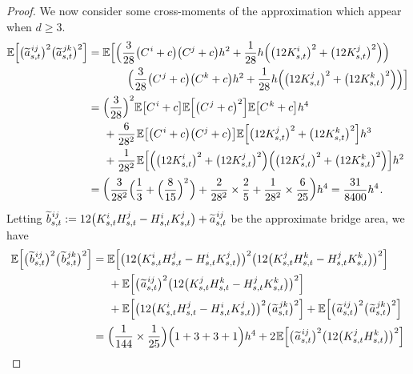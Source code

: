 \documentclass[sn-mathphys-num]{sn-jnl}%
\newcommand{\E}{\mathbb{E}}
\newcommand{\m}{\hspace{0.25mm}}
\newcommand{\mm}{\hspace{5mm}}
\begin{document}
\begin{proof}
We now consider some cross-moments of the approximation which appear when $d\geq 3$.
\begin{align*}
\E\Big[\big(\widetilde{a}_{s,t}^{\m ij}\big)^2\big(\widetilde{a}_{s,t}^{\m jk}\big)^2\Big]
& = \E\Big[\Big(\frac{3}{28}\big(C^{\m i} + c\big)\big(C^j + c\big)h^2 + \frac{1}{28}h\Big(\big(12 K_{s,t}^i\big)^2 + \big(12 K_{s,t}^j\big)^2\Big)\Big)\\
&\hspace{12.5mm}\Big(\frac{3}{28}\big(C^{\m j} + c\big)\big(C^k + c\big)h^2 + \frac{1}{28}h\Big(\big(12 K_{s,t}^j\big)^2 + \big(12 K_{s,t}^k\big)^2\Big)\Big)\Big]\\[1pt]
& = \Big(\frac{3}{28}\Big)^2 \E\big[C^{\m i} + c\big]\E\Big[\big(C^{\m j} + c\big)^2\Big]\E\big[C^{\m k} + c\big] h^4\\
&\mm + \frac{6}{28^2}\m\E\big[\big(C^{\m i} + c\big)\big(C^j + c\big)\big]\E\Big[\big(12 K_{s,t}^j\big)^2 + \big(12 K_{s,t}^k\big)^2\Big] h^3\\
&\mm + \frac{1}{28^2}\m\E\Big[\Big(\big(12 K_{s,t}^i\big)^2 + \big(12 K_{s,t}^j\big)^2\Big)\Big(\big(12 K_{s,t}^j\big)^2 + \big(12 K_{s,t}^k\big)^2\Big)\Big] h^2\\[1pt]
& = \bigg(\frac{3}{28^2}\Big(\frac{1}{3} + \Big(\frac{8}{15}\Big)^2\m\Big) + \frac{2}{28^2}\times \frac{2}{5} + \frac{1}{28^2}\times\frac{6}{25}\bigg)h^4 = \frac{31}{8400}h^4\m.
\end{align*}
Letting $\widetilde{b}_{s,t}^{\m ij} := 12\big(K_{s,t}^i H_{s,t}^j - H_{s,t}^i K_{s,t}^j\big) + \widetilde{a}_{s,t}^{\m ij}$ be the approximate bridge area, we have
\begin{align*}
\E\Big[\big(\m\widetilde{b}_{s,t}^{\m ij}\big)^2\big(\m\widetilde{b}_{s,t}^{\m jk}\big)^2\Big] & = \E\Big[\big(12\big(K_{s,t}^i H_{s,t}^j - H_{s,t}^i K_{s,t}^j\big)\big)^2\big(12\big(K_{s,t}^j H_{s,t}^k - H_{s,t}^j K_{s,t}^k\big)\big)^2\Big]\\
&\mm + \E\Big[\big(\m\widetilde{a}_{s,t}^{\m ij}\big)^2\big(12\big(K_{s,t}^j H_{s,t}^k - H_{s,t}^j K_{s,t}^k\big)\big)^2\Big]\\
&\mm + \E\Big[\big(12\big(K_{s,t}^i H_{s,t}^j - H_{s,t}^i K_{s,t}^j\big)\big)^2\big(\m\widetilde{a}_{s,t}^{\m jk}\big)^2\Big] + \E\Big[\big(\m\widetilde{a}_{s,t}^{\m ij}\big)^2\big(\m\widetilde{a}_{s,t}^{\m jk}\big)^2\Big]\\[1pt]
& = \Big(\frac{1}{144}\times \frac{1}{25} \Big)\Big(1 + 3 + 3 + 1\Big)h^4 + 2\m\E\Big[\big(\m\widetilde{a}_{s,t}^{\m ij}\big)^2\big(12\big(K_{s,t}^j H_{s,t}^k\big)\big)^2\Big]\\

\end{align*}
\end{proof}
\end{document}
